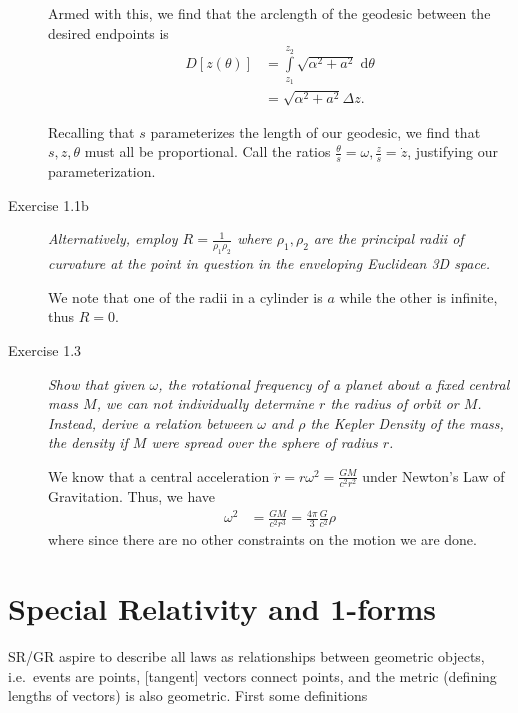 \documentclass[12pt]{report}
\begin{document}
\begin{description}
        Armed with this, we find that the arclength of the geodesic between the
        desired endpoints is
        \begin{align}
            D[z(\theta)] &= \int\limits_{z_1}^{z_2}
                \sqrt{\alpha^2 + a^2}\;\mathrm{d}\theta\\
                &= \sqrt{\alpha^2 + a^2}\Delta z.
        \end{align}

        Recalling that $s$ parameterizes the length of our geodesic, we find
        that $s, z, \theta$ must all be proportional. Call the ratios
        $\frac{\theta}{s} = \omega, \frac{z}{s} = \dot{z}$, justifying our
        parameterization.

    \item[Exercise 1.1b] \emph{Alternatively, employ $R =
        \frac{1}{\rho_1\rho_2}$ where $\rho_1, \rho_2$ are the principal radii
        of curvature at the point in question in the enveloping Euclidean 3D
        space.}

        We note that one of the radii in a cylinder is $a$ while the other is
        infinite, thus $R=0$.

    \item[Exercise 1.3] \emph{Show that given $\omega$, the rotational frequency
        of a planet about a fixed central mass $M$, we can not individually
        determine $r$ the radius of orbit or $M$. Instead, derive a relation
        between $\omega$ and $\rho$ the \emph{Kepler Density} of the mass, the
        density if $M$ were spread over the sphere of radius $r$.}

        We know that a central acceleration $\ddot{r} = r\omega^2 =
        \frac{GM}{c^2r^2}$ under Newton's Law of Gravitation. Thus, we have
        \begin{align*}
            \omega^2 &= \frac{GM}{c^2r^3} = \frac{4\pi}{3}\frac{G}{c^2}\rho
        \end{align*}
        where since there are no other constraints on the motion we are done.
\end{description}

\section{Special Relativity and 1-forms}

SR/GR aspire to describe all laws as relationships between geometric objects,
i.e.\ events are points, [tangent] vectors connect points, and the metric
(defining lengths of vectors) is also geometric. First some definitions
\end{document}
